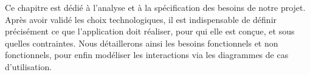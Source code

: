 Ce chapitre est dédié à l'analyse et à la spécification des besoins de notre projet. Après avoir validé les choix technologiques, il est indispensable de définir précisément ce que l'application doit réaliser, pour qui elle est conçue, et sous quelles contraintes. Nous détaillerons ainsi les besoins fonctionnels et non fonctionnels, pour enfin modéliser les interactions via les diagrammes de cas d'utilisation.
